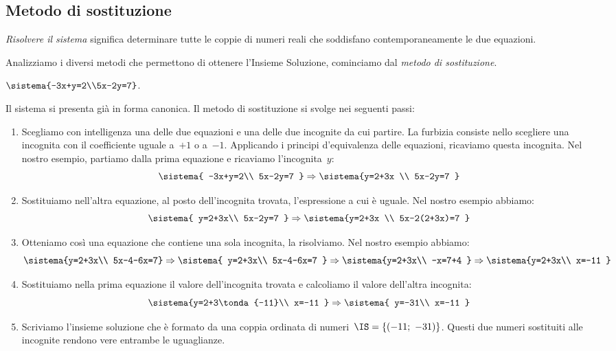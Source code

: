 \subsection{Metodo di sostituzione}
\emph{Risolvere il sistema} significa determinare tutte le coppie di
numeri reali che soddisfano contemporaneamente le due equazioni.

Analizziamo i diversi metodi che permettono di ottenere
l'Insieme Soluzione, cominciamo dal \emph{metodo di sostituzione}.

\begin{esempio}{}{}
\(\sistema{-3x+y=2\\5x-2y=7}\).
\end{esempio}

Il sistema si presenta già in forma canonica. Il metodo di
sostituzione si svolge nei seguenti passi:

\begin{enumerate}
 \item Scegliamo con intelligenza una delle due equazioni e una
delle due incognite da cui partire. 
La furbizia consiste nello scegliere una incognita con il coefficiente 
uguale a~\(+1\) o a~\(-1\).
Applicando i principi d'equivalenza delle equazioni, ricaviamo questa
incognita.
Nel nostro esempio, partiamo dalla prima equazione e ricaviamo
l'incognita~\(y\):
\[\sistema{
     -3x+y=2\\
     5x-2y=7
  }
\Rightarrow
  \sistema{y=2+3x \\
           5x-2y=7
  }
\]

\item Sostituiamo nell'altra equazione, al posto
dell'incognita trovata, l'espressione a cui è uguale. 
Nel nostro esempio abbiamo:
\[\sistema{
     y=2+3x\\
     5x-2y=7
  }
\Rightarrow
\sistema{y=2+3x \\
         5x-2(2+3x)=7
}\]

\item Otteniamo così una equazione che contiene una sola 
incognita, la risolviamo.
Nel nostro esempio abbiamo:
\[\sistema{y=2+3x\\
5x-4-6x=7}\Rightarrow
\sistema{
         y=2+3x\\
         5x-4-6x=7
        }\Rightarrow
 \sistema{y=2+3x\\
         -x=7+4
        }\Rightarrow
 \sistema{y=2+3x\\
         x=-11
  }\]

\item Sostituiamo nella prima equazione il valore dell'incognita 
trovata e calcoliamo il valore dell'altra incognita:
\[ \sistema{y=2+3\tonda{-11}\\
         x=-11
  }\Rightarrow
  \sistema{
         y=-31\\
         x=-11
  }\]

 \item Scriviamo l'insieme soluzione che è formato da una coppia ordinata 
di numeri~\(\IS=\{(-11;~-31)\}\). Questi due numeri sostituiti alle 
incognite rendono vere entrambe le uguaglianze.
\end{enumerate}

